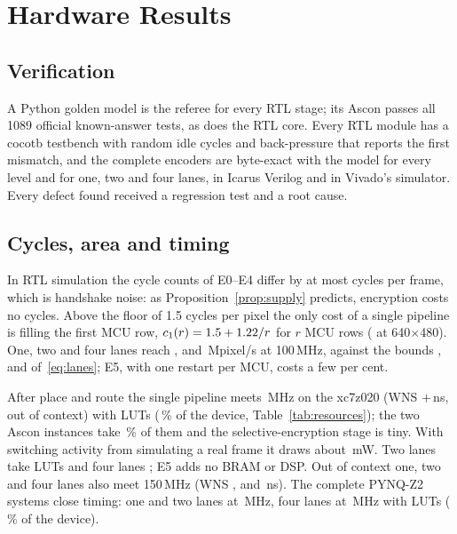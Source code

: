 \section{Hardware Results}\label{sec:hwresults}
\subsection{Verification}\label{sec:verification}
A Python golden model is the referee for every RTL stage; its Ascon passes all 1089 official known-answer tests, as does the RTL core. Every RTL module has a cocotb testbench with random idle cycles and back-pressure that reports the first mismatch, and the complete encoders are byte-exact with the model for every level and for one, two and four lanes, in Icarus Verilog and in Vivado's simulator. Every defect found received a regression test and a root cause.

\subsection{Cycles, area and timing}
In RTL simulation the cycle counts of E0--E4 differ by at most \MaxExtraCycles{} cycles per frame, which is handshake noise: as Proposition~\ref{prop:supply} predicts, encryption costs no cycles. Above the floor of 1.5 cycles per pixel the only cost of a single pipeline is filling the first MCU row, $c_1(r) = 1.5 + 1.22/r$ for $r$ MCU rows (\CppVGA{} at 640$\times$480). One, two and four lanes reach \RtlOneLaneMpix, \RtlTwoLanesMpix{} and \RtlFourLanesMpix\,Mpixel/s at 100\,MHz, against the bounds \BoundOneMpix, \BoundTwoMpix{} and \BoundFourMpix{} of~\eqref{eq:lanes}; E5, with one restart per MCU, costs a few per cent.


After place and route the single pipeline meets \TopMhz\,MHz on the xc7z020 (WNS $+$\TopWns\,ns, out of context) with \TopLuts{} LUTs (\TopLutPct\,\% of the device, Table~\ref{tab:resources}); the two Ascon instances take \CryptoLutShare\,\% of them and the selective-encryption stage is tiny. With switching activity from simulating a real frame it draws about \SaifTopMw\,mW. Two lanes take \TwoLanesLuts{} LUTs and four lanes \FourLanesLuts{}; E5 adds no BRAM or DSP. Out of context one, two and four lanes also meet 150\,MHz (WNS \TopWnsAtOneFifty, \LanesTwoWnsAtOneFifty{} and \LanesFourWnsAtOneFifty\,ns). The complete PYNQ-Z2 systems close timing: one and two lanes at \OverlayMhz\,MHz, four lanes at \OverlayLanesFourMhz\,MHz with \OverlayLanesFourLuts{} LUTs (\OverlayLanesFourLutPct\,\% of the device).


